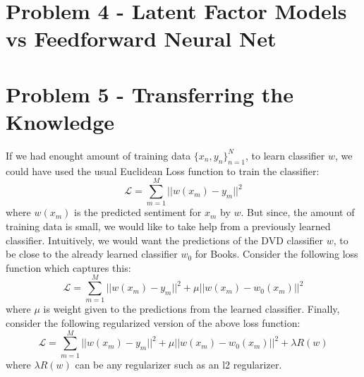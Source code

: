 \documentclass{article}
\begin{document}
\section{Problem 4 - Latent Factor Models vs Feedforward Neural Net}

\section{Problem 5 - Transferring the Knowledge}
If we had enought amount of training data $\{x_n,y_n\}_{n=1}^N$, to learn classifier $w$, we could have used the usual Euclidean Loss function to train the classifier:
$$\mathcal{L} = \sum_{m=1}^M ||w(x_m)-y_m||^2$$
where $w(x_m)$ is the predicted sentiment for $x_m$ by $w$. But since, the amount of training data is small, we would like to take help from a previously learned classifier. Intuitively, we would want the predictions of the DVD classifier $w$, to be close to the already learned classifier $w_0$ for Books. Consider the following loss function which captures this:
$$\mathcal{L} = \sum_{m=1}^M ||w(x_m)-y_m||^2 + \mu||w(x_m)-w_0(x_m)||^2 $$ 
where $\mu$ is weight given to the predictions from the learned classifier. Finally, consider the following regularized version of the above loss function:
$$\mathcal{L} = \sum_{m=1}^M ||w(x_m)-y_m||^2 + \mu||w(x_m)-w_0(x_m)||^2 + \lambda R(w)$$ 
where $\lambda R(w)$ can be any regularizer such as an l2 regularizer.
\end{document}
